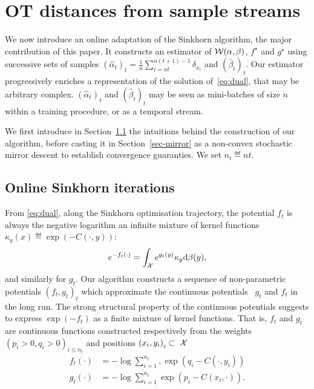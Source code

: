 
\section{OT distances from sample streams}

We now introduce an online adaptation of the Sinkhorn algorithm, the major
contribution of this paper. It constructs an estimator of
$\mathcal{W}(\alpha,\beta)$, $f^\star$ and $g^\star$ using successive sets of samples
$(\hat \alpha_t)_t = \frac{1}{n} \sum_{i=nt}^{n(t+1) - 1} \delta_{x_i}$ and
${(\hat \beta_t)}_t$. 
%
Our estimator progressively enriches a representation of the
solution of~\eqref{eq:dual}, that may be arbitrary complex. $(\hat \alpha_t)_t$
and $(\hat \beta_t)_t$ may be seen as mini-batches of size $n$ within a training procedure,
or as a temporal stream. 

We first introduce in Section~\ref{sec-online-sink-iter} the intuitions behind the construction of our algorithm,
before casting it in Section~\ref{sec-mirror} as a non-convex stochastic mirror descent to establish convergence guaranties. 
%
We set $n_t \eqdef nt$.


\subsection{Online Sinkhorn iterations}
\label{sec-online-sink-iter}

From \eqref{eq:dual}, along the Sinkhorn optimisation trajectory, the potential $f_t$ is always the negative logarithm an
infinite mixture of kernel functions $\kappa_y(x) \eqdef \exp(-C(\cdot, y))$:
\begin{equation*}
    e^{-f_t(\cdot)} = 
    \int_{\mathcal{X}} e^{g_t(y)}  \kappa_y  \textrm{d} \beta(y),
\end{equation*}
and similarly for $g_t$. Our algorithm constructs a sequence of
non-parametric potentials $(f_t, g_t)_t$ which approximate the continuous
potentials  $g_t$ and $f_t$ in the long run. The strong structural property of
the continuous potentials suggests to express
$\exp(-f_t)$ as a finite mixture of kernel functions.
That is, $f_t$ and $g_t$ are continuous functions constructed
respectively from the weights ${(p_i > 0, q_i > 0)}_{i \leq n_t}$ and
positions ${(x_i, y_i)}_{i} \subset~\mathcal{X}$
\begin{align}\label{eq:param}
    f_t(\cdot) &= - \log \sum_{i=1}^{n_t}, 
    \exp(q_i - C(\cdot, y_i)) \\
    g_t(\cdot) &= - \log \sum_{i=1}^{n_t}
    \exp(p_i - C(x_i, \cdot)).
\end{align}

